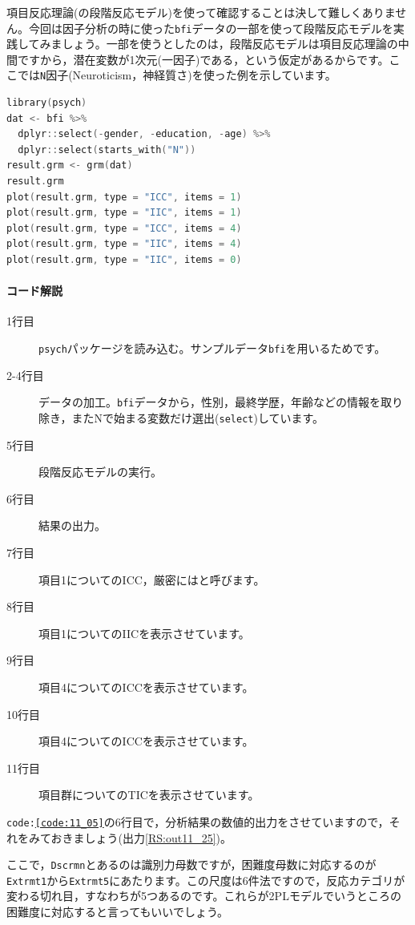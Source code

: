 \documentclass{ltjsbook}
\begin{document}
項目反応理論(の段階反応モデル)を使って確認することは決して難しくありません。今回は因子分析の時に使った\texttt{bfi}データの一部を使って段階反応モデルを実践してみましょう。一部を使うとしたのは，段階反応モデルは項目反応理論の中間ですから，潜在変数が1次元(一因子)である，という仮定があるからです。ここでは\texttt{N}因子(Neuroticism，神経質さ)を使った例を示しています。

\begin{lstlisting}[language=c++,label={code:11_05},caption={GRMの実行}]
library(psych)
dat <- bfi %>%
  dplyr::select(-gender, -education, -age) %>%
  dplyr::select(starts_with("N"))
result.grm <- grm(dat)
result.grm
plot(result.grm, type = "ICC", items = 1)
plot(result.grm, type = "IIC", items = 1)
plot(result.grm, type = "ICC", items = 4)
plot(result.grm, type = "IIC", items = 4)
plot(result.grm, type = "IIC", items = 0)
\end{lstlisting}

\paragraph{コード解説}
\begin{description}
	\item[1行目] \texttt{psych}パッケージを読み込む。サンプルデータ\texttt{bfi}を用いるためです。
	\item[2-4行目] データの加工。\texttt{bfi}データから，性別，最終学歴，年齢などの情報を取り除き，またNで始まる変数だけ選出(\texttt{select})しています。
	\item[5行目] 段階反応モデルの実行。
	\item[6行目] 結果の出力。
	\item[7行目] 項目1についてのICC，厳密にはと呼びます。
	\item[8行目] 項目1についてのIICを表示させています。
	\item[9行目] 項目4についてのICCを表示させています。
	\item[10行目] 項目4についてのICCを表示させています。
	\item[11行目]項目群についてのTICを表示させています。
\end{description}

\texttt{code:\ref{code:11_05}}の6行目で，分析結果の数値的出力をさせていますので，それをみておきましょう(出力\ref{RS:out11_25})。

ここで，\texttt{Dscrmn}とあるのは識別力母数ですが，困難度母数に対応するのが\texttt{Extrmt1}から\texttt{Extrmt5}にあたります。この尺度は6件法ですので，反応カテゴリが変わる切れ目，すなわちが5つあるのです。これらが2PLモデルでいうところの困難度に対応すると言ってもいいでしょう。
\end{document}
